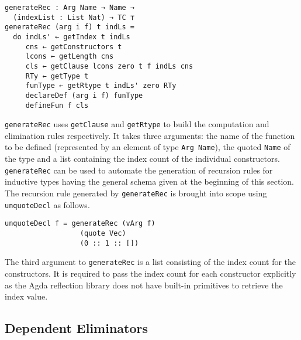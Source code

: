 \documentclass[sigplan,10pt]{acmart}
\begin{document}
\begin{center}
\begingroup
\begin{BVerbatim}
generateRec : Arg Name → Name → 
  (indexList : List Nat) → TC ⊤
generateRec (arg i f) t indLs =
  do indLs' ← getIndex t indLs
     cns ← getConstructors t
     lcons ← getLength cns
     cls ← getClause lcons zero t f indLs cns
     RTy ← getType t
     funType ← getRtype t indLs' zero RTy
     declareDef (arg i f) funType
     defineFun f cls
\end{BVerbatim}
\endgroup
\end{center}

\normalsize

{\tt generateRec} uses {\tt getClause} and {\tt getRtype} to build the computation and elimination rules respectively. It takes three arguments: the name of the function to be defined (represented by an element of type {\tt Arg Name}), the quoted {\tt Name} of the type and a list containing the index count of the individual constructors. {\tt generateRec} can be used to automate the generation of recursion rules for inductive types having the general schema given at the beginning of this section. The recursion rule generated by {\tt generateRec} is brought into scope using {\tt unquoteDecl} as follows.

\begin{center}
\begingroup
\begin{BVerbatim}
unquoteDecl f = generateRec (vArg f)
                  (quote Vec) 
                  (0 :: 1 :: [])
\end{BVerbatim}
\endgroup
\end{center}

\normalsize

The third argument to {\tt generateRec} is a list consisting of the index count for the constructors. It is required to pass the index count for each constructor explicitly as the Agda reflection library does not have built-in primitives to retrieve the index value.

\subsection{Dependent Eliminators}
\label{sec:sec3.2}
\end{document}
